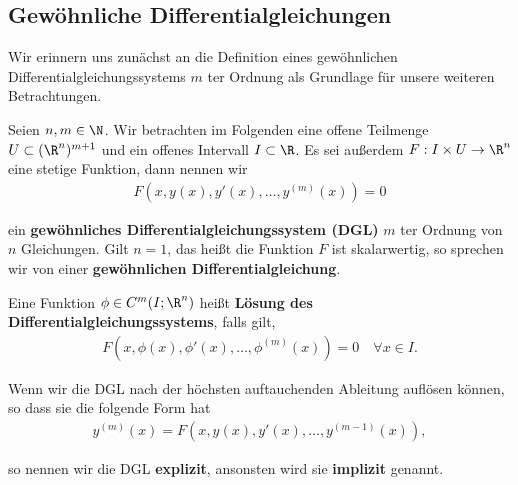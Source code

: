 \documentclass[letterpaper,10pt,english]{jupyterBook}
\begin{document}
\subsection{Gewöhnliche Differentialgleichungen}
\label{\detokenize{ode/repetition:gewohnliche-differentialgleichungen}}
\par
Wir erinnern uns zunächst an die Definition eines gewöhnlichen Differentialgleichungssystems \(m\) ter Ordnung als Grundlage für unsere weiteren Betrachtungen.
\label{ode/repetition:def:DGL}
\begin{definition}{}{}



\par
Seien \(n,m \in \N\).
Wir betrachten im Folgenden eine offene Teilmenge \(U\subset (\R^n)^{m+1}\) und ein offenes Intervall \(I\subset\R\).
Es sei außerdem \(F:I\times U\rightarrow\R^n\) eine stetige Funktion, dann nennen wir
\begin{align}\label{equation:ode/repetition:eq:DGL}
F(x,y(x),y'(x),\ldots,y^{(m)}(x)) = 0
\end{align}
\par
ein \textbf{gewöhnliches Differentialgleichungssystem (DGL)} \(m\) ter Ordnung von \(n\) Gleichungen.
Gilt \(n=1\), das heißt die Funktion \(F\) ist skalarwertig, so sprechen wir von einer \textbf{gewöhnlichen Differentialgleichung}.

\par
Eine Funktion \(\phi\in C^m(I;\R^n)\) heißt \textbf{Lösung des Differentialgleichungssystems}, falls gilt,
\begin{align*}
F(x, \phi(x), \phi'(x), \ldots, \phi^{(m)}(x)) = 0 \quad \forall x\in I.
\end{align*}
\par
Wenn wir die DGL nach der höchsten auftauchenden Ableitung auflösen können, so dass sie die folgende Form hat
\begin{align*}
y^{(m)}(x) = F(x,y(x),y'(x),\ldots,y^{(m-1)}(x)),
\end{align*}
\par
so nennen wir die DGL \textbf{explizit}, ansonsten wird sie \textbf{implizit} genannt.
\end{definition}
\end{document}
